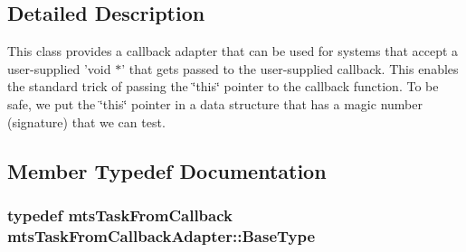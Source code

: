 \subsection{Detailed Description}
This class provides a callback adapter that can be used for systems that accept a user-\/supplied 'void $\ast$' that gets passed to the user-\/supplied callback. This enables the standard trick of passing the \char`\"{}this\char`\"{} pointer to the callback function. To be safe, we put the \char`\"{}this\char`\"{} pointer in a data structure that has a magic number (signature) that we can test. 

\subsection{Member Typedef Documentation}
\hypertarget{classmts_task_from_callback_adapter_a1f50853b13e0014ad9c64ac6b11f3216}{
\subsubsection[{Base\-Type}]{\setlength{\rightskip}{0pt plus 5cm}typedef {\bf mts\-Task\-From\-Callback} {\bf mts\-Task\-From\-Callback\-Adapter\-::\-Base\-Type}\hspace{0.3cm}{\ttfamily [protected]}}}\label{classmts_task_from_callback_adapter_a1f50853b13e0014ad9c64ac6b11f3216}


